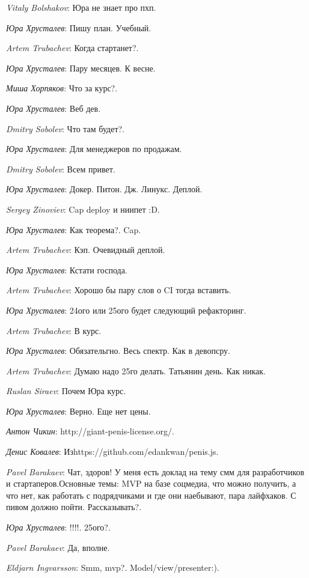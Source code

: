 \documentclass[10pt]{book}
\newcommand{\AUTHOR}[1]{\emph{#1}:}
\begin{document}
\AUTHOR{Vitaly Bolshakov} Юра не знает про пхп.

\AUTHOR{Юра Хрусталев} Пишу план. Учебный.

\AUTHOR{Artem Trubachev} Когда стартанет?.

\AUTHOR{Юра Хрусталев} Пару месяцев. К весне.

\AUTHOR{Миша Хорпяков} Что за курс?.

\AUTHOR{Юра Хрусталев} Веб дев.

\AUTHOR{Dmitry Sobolev} Что там будет?.

\AUTHOR{Юра Хрусталев} Для менеджеров по продажам.

\AUTHOR{Dmitry Sobolev} Всем привет.

\AUTHOR{Юра Хрусталев} Докер. Питон. Дж. Линукс. Деплой.

\AUTHOR{Sergey Zinoviev} Cap deploy и ниипет :D.

\AUTHOR{Юра Хрусталев} Как теорема?. Cap.

\AUTHOR{Artem Trubachev} Кэп. Очевидный деплой.

\AUTHOR{Юра Хрусталев} Кстати господа.

\AUTHOR{Artem Trubachev} Хорошо бы пару слов о CI  тогда вставить.

\AUTHOR{Юра Хрусталев} 24ого или 25ого будет следующий рефакторинг.

\AUTHOR{Artem Trubachev} В курс.

\AUTHOR{Юра Хрусталев} Обязательгно. Весь спектр. Как в девопсру.

\AUTHOR{Artem Trubachev} Думаю надо 25го делать. Татьянин день. Как никак.

\AUTHOR{Ruslan Siraev} Почем Юра курс.

\AUTHOR{Юра Хрусталев} Верно. Еще нет цены.

\AUTHOR{Антон Чикин} http://giant-penis-license.org/.

\AUTHOR{Денис Ковалев} Изhttps://github.com/edankwan/penis.js.

\AUTHOR{Pavel Barakaev} Чат, здоров! У меня есть доклад на тему смм для разработчиков и стартаперов.Основные темы: MVP на базе соцмедиа, что можно получить, а что нет, как работать с подрядчиками и где они наебывают, пара лайфхаков. С пивом должно пойти. Рассказывать?.

\AUTHOR{Юра Хрусталев} !!!!. 25ого?.

\AUTHOR{Pavel Barakaev} Да, вполне.

\AUTHOR{Eldjarn Ingvarsson} Smm, mvp?. Model/view/presenter:).
\end{document}
